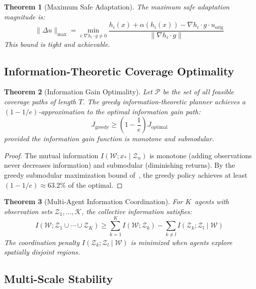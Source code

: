 \documentclass[11pt,twocolumn]{article}
\newtheorem{theorem}{Theorem}[section]
\theoremstyle{definition}
\newcommand{\cK}{\mathcal{K}}
\newcommand{\cP}{\mathcal{P}}
\newcommand{\cW}{\mathcal{W}}
\newcommand{\cZ}{\mathcal{Z}}
\begin{document}
\begin{theorem}[Maximum Safe Adaptation]
\label{thm:max_adaptation}
The maximum safe adaptation magnitude is:
\begin{equation}
\|\Delta u\|_{\max} = \min_{i: \nabla h_i \cdot g \neq 0} \frac{h_i(x) + \alpha(h_i(x)) - \nabla h_i \cdot g \cdot u_{\text{orig}}}{\|\nabla h_i \cdot g\|}
\end{equation}
This bound is tight and achievable.
\end{theorem}

\subsection{Information-Theoretic Coverage Optimality}

\begin{theorem}[Information Gain Optimality]
\label{thm:info_optimal}
Let $\cP$ be the set of all feasible coverage paths of length $T$. The greedy information-theoretic planner achieves a $(1 - 1/e)$-approximation to the optimal information gain path:
\begin{equation}
J_{\text{greedy}} \geq \left(1 - \frac{1}{e}\right) J_{\text{optimal}}
\end{equation}
provided the information gain function is monotone and submodular.
\end{theorem}

\begin{proof}
The mutual information $I(\cW; x_* \mid \cZ_n)$ is monotone (adding observations never decreases information) and submodular (diminishing returns). By the greedy submodular maximization bound of~\citet{Nemhauser1978}, the greedy policy achieves at least $(1 - 1/e) \approx 63.2\%$ of the optimal.
\end{proof}

\begin{theorem}[Multi-Agent Information Coordination]
\label{thm:multi_info}
For $K$~agents with observation sets $\cZ_1, \ldots, \cK$, the collective information satisfies:
\begin{equation}
I(\cW; \cZ_1 \cup \cdots \cup \cZ_K) \geq \sum_{k=1}^K I(\cW; \cZ_k) - \sum_{k \neq l} I(\cZ_k; \cZ_l \mid \cW)
\end{equation}
The coordination penalty $I(\cZ_k; \cZ_l \mid \cW)$ is minimized when agents explore spatially disjoint regions.
\end{theorem}

\subsection{Multi-Scale Stability}
\end{document}
